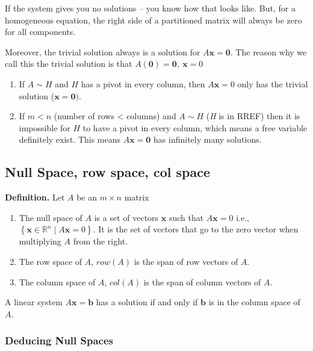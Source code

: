 \documentclass[
]{article}
\begin{document}
If the system gives you no solutions -- you know how that looks like.
But, for a homogeneous equation, the right side of a partitioned matrix
will always be zero for all components.

Moreover, the trivial solution always is a solution for
$A\mathbf{x} = \mathbf{0}$. The reason why we call this the
trivial solution is that
$A\left( \mathbf{0} \right) = \mathbf{0},\ \mathbf{x} = 0$

\begin{enumerate}
\def\labelenumi{\arabic{enumi}.}
\setcounter{enumi}{1}
\item
  If $A\sim H$ and $H$ has a pivot in every column, then
  $A\mathbf{x} = 0$ only has the trivial solution
  ($\mathbf{x} = \mathbf{0})$.
\item
  If $m < n$ (number of rows \textless{} columns) and $A\sim H$
  (\emph{H} is in RREF) then it is impossible for $H$ to have a pivot
  in every column, which means a free variable definitely exist. This
  means $A\mathbf{x} = \mathbf{0}$ has infinitely many
  solutions.
\end{enumerate}


\subsection{Null Space, row space, col
space}

\textbf{Definition.} Let $A$ be an $m \times n$ matrix

\begin{enumerate}
\def\labelenumi{\arabic{enumi}.}
\item
  The null space of $A$ is a set of vectors $\mathbf{x}$ such
  that $A\mathbf{x} = 0$ i.e.,
  $\left\{ \mathbf{x} \in \mathbb{R}^{n}\mid A\mathbf{x} = 0 \right\}$.
  It is the set of vectors that go to the zero vector when multiplying
  $A$ from the right.
\item
  The row space of $A$, $row(A)$ is the span of row vectors of
  $A$.
\item
  The column space of $A$, $col(A)$ is the span of column vectors of
  $A$.
\end{enumerate}

A linear system $A\mathbf{x} = \mathbf{b}$ has a solution if
and only if $\mathbf{b}$ is in the column space of $A$.


\subsubsection{Deducing Null Spaces}
\end{document}
